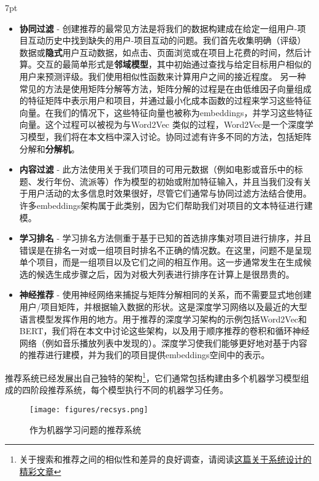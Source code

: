 \documentclass[Chinese, 11pt, table]{diazessay} %
\newenvironment{formal}{%
  \def\FrameCommand{%
	\hspace{1pt}%
	{\color{w_lightblue}\vrule width 2pt}%
	{\color{formalshade}\vrule width 4pt}%
	\colorbox{formalshade}%
  }%
  \MakeFramed{\advance\hsize-\width\FrameRestore}%
  \noindent\hspace{-4.55pt}%
  \begin{adjustwidth}{}{7pt}%
  \vspace{2pt}\vspace{2pt}%
}
{%
  \vspace{2pt}\end{adjustwidth}\endMakeFramed%
}
\begin{document}
\begin{CJK}{UTF8}{gbsn}
\begin{sloppypar}
\begin{formal}
\begin{itemize}
  \item \textbf{协同过滤} - 创建推荐的最常见方法是将我们的数据构建成在给定一组用户-项目互动历史中找到缺失的用户-项目互动的问题。我们首先收集明确（评级）数据或\textbf{隐式}用户互动数据，如点击、页面浏览或在项目上花费的时间，然后计算。交互的最简单形式是\textbf{邻域模型}，其中初始通过查找与给定目标用户相似的用户来预测评级。我们使用相似性函数来计算用户之间的接近程度。
  另一种常见的方法是使用矩阵分解等方法，矩阵分解的过程是在由低维因子向量组成的特征矩阵中表示用户和项目，并通过最小化成本函数的过程来学习这些特征向量。在我们的情况下，这些特征向量也被称为embeddings，并学习这些特征向量。这个过程可以被视为与Word2Vec \citep{levy2014neural} 类似的过程，Word2Vec是一个深度学习模型，我们将在本文档中深入讨论。协同过滤有许多不同的方法，包括矩阵分解和\textbf{分解机}。
   \item \textbf{内容过滤} - 此方法使用关于我们项目的可用元数据（例如电影或音乐中的标题、发行年份、流派等）作为模型的初始或附加特征输入，并且当我们没有关于用户活动的太多信息时效果很好，尽管它们通常与协同过滤方法结合使用。许多embeddings架构属于此类别，因为它们帮助我们对项目的文本特征进行建模。
  \item \textbf{学习排名} - 学习排名方法侧重于基于已知的首选排序集对项目进行排序，并且错误是在排名一对或一组项目时排名不正确的情况数。在这里，问题不是呈现单个项目，而是一组项目以及它们之间的相互作用。这一步通常发生在生成候选的候选生成步骤之后，因为对极大列表进行排序在计算上是很昂贵的。
  \item \textbf{神经推荐} - 使用神经网络来捕捉与矩阵分解相同的关系，而不需要显式地创建用户/项目矩阵，并根据输入数据的形状。这是深度学习网络以及最近的大型语言模型发挥作用的地方。用于推荐的深度学习架构的示例包括Word2Vec和BERT，我们将在本文中讨论这些架构，以及用于顺序推荐的卷积和循环神经网络（例如音乐播放列表中发现的）。深度学习使我们能够更好地对基于内容的推荐进行建模，并为我们的项目提供embeddings空间中的表示。\citep{zhang2019deep}
\end{itemize}
\end{formal}

推荐系统已经发展出自己独特的架构\footnote{关于搜索和推荐之间的相似性和差异的良好调查，请阅读\href{https://eugeneyan.com/writing/system-design-for-discovery/}{这篇关于系统设计的精彩文章}}，它们通常包括构建由多个机器学习模型组成的四阶段推荐系统，每个模型执行不同的机器学习任务。

\begin{figure}[H]
\centering
\texttt{[image: figures/recsys.png]}
\caption{作为机器学习问题的推荐系统}
\end{figure}


\end{sloppypar}
\end{CJK}
\end{document}
